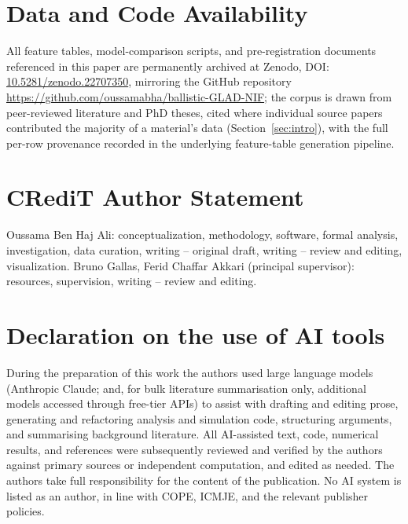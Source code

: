 \documentclass[aip,amsmath,amssymb,reprint]{revtex4-1}
\begin{document}
\section*{Data and Code Availability}
All feature tables, model-comparison scripts, and pre-registration
documents referenced in this paper are permanently archived at Zenodo,
DOI: \href{https://doi.org/10.5281/zenodo.22707350}{10.5281/zenodo.22707350}, mirroring the GitHub repository
\url{https://github.com/oussamabha/ballistic-GLAD-NIF}; the corpus is drawn from
peer-reviewed literature and PhD theses, cited where individual source
papers contributed the majority of a material's data
(Section~\ref{sec:intro}), with the full per-row provenance recorded
in the underlying feature-table generation pipeline.

\section*{CRediT Author Statement}
Oussama Ben Haj Ali: conceptualization, methodology, software,
formal analysis, investigation, data curation, writing -- original
draft, writing -- review and editing, visualization. Bruno Gallas,
Ferid Chaffar Akkari (principal supervisor): resources, supervision, writing
-- review and editing.

\section*{Declaration on the use of AI tools}
During the preparation of this work the authors used large language models
(Anthropic Claude; and, for bulk literature summarisation only, additional
models accessed through free-tier APIs) to assist with drafting and editing
prose, generating and refactoring analysis and simulation code, structuring
arguments, and summarising background literature. All AI-assisted text, code,
numerical results, and references were subsequently reviewed and verified by the
authors against primary sources or independent computation, and edited as
needed. The authors take full responsibility for the content of the publication.
No AI system is listed as an author, in line with COPE, ICMJE, and the relevant
publisher policies.



\end{document}
